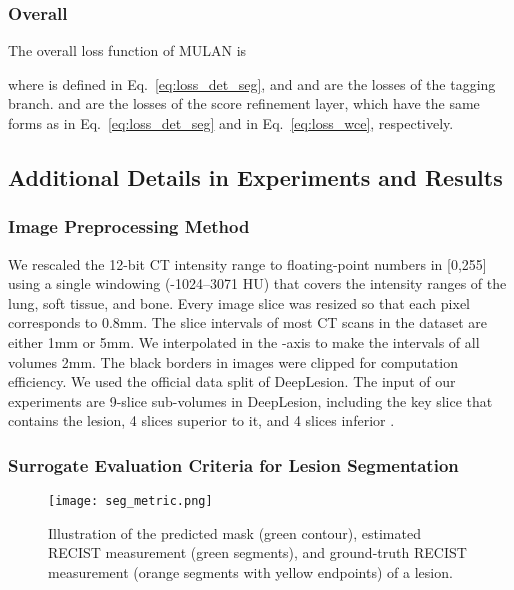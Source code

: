 \documentclass[runningheads]{llncs}
\def\Eq#1{{Eq.\ \ref{eq:#1}}}
\begin{document}
\subsubsection{Overall}

The overall loss function of MULAN is

where  is defined in \Eq{loss_det_seg}, and  and  are the losses of the tagging branch.  and  are the losses of the score refinement layer, which have the same forms as  in \Eq{loss_det_seg} and  in \Eq{loss_wce}, respectively.

\subsection{Additional Details in Experiments and Results}

\subsubsection{Image Preprocessing Method}

We rescaled the 12-bit CT intensity range to floating-point numbers in [0,255] using a single windowing (-1024--3071 HU) that covers the intensity ranges of the lung, soft tissue, and bone. Every image slice was resized so that each pixel corresponds to 0.8mm. The slice intervals of most CT scans in the dataset are either 1mm or 5mm. We interpolated in the -axis to make the intervals of all volumes 2mm. The black borders in images were clipped for computation efficiency. We used the official data split of DeepLesion. The input of our experiments are 9-slice sub-volumes in DeepLesion, including the key slice that contains the lesion, 4 slices superior to it, and 4 slices inferior \cite{Yan20183DCE}.

\subsubsection{Surrogate Evaluation Criteria for Lesion Segmentation}

\begin{figure}[]
	\begin{center}
\texttt{[image: seg\_metric.png]} \end{center}
	\caption{Illustration of the predicted mask (green contour), estimated RECIST measurement (green segments), and ground-truth RECIST measurement (orange segments with yellow endpoints) of a lesion.}
	\label{fig:seg_metric}
\end{figure}
\end{document}
